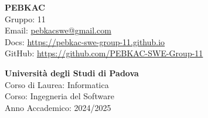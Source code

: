 \begin{minipage}[]{0.3\textwidth}
 
\end{minipage}
\hspace{0.05\textwidth}
\begin{minipage}[]{0.65\textwidth}
  {\Large \textbf{PEBKAC}} \\
  Gruppo: 11 \\
  Email: \href{mailto:pebkacswe@gmail.com}{pebkacswe@gmail.com} \\
  Docs: \href{https://pebkac-swe-group-11.github.io}{https://pebkac-swe-group-11.github.io} \\
  GitHub: \href{https://github.com/PEBKAC-SWE-Group-11}{https://github.com/PEBKAC-SWE-Group-11} \\
  
\end{minipage}

\bigskip

\begin{minipage}[]{0.3\textwidth}
 
\end{minipage}
\hspace{0.05\textwidth}
\begin{minipage}[]{0.65\textwidth}
  \textcolor{unipd}{
    \textbf{Università degli Studi di Padova} \\
    Corso di Laurea: Informatica \\
    Corso: Ingegneria del Software \\
    Anno Accademico: 2024/2025
  }
\end{minipage}


\bigskip
\bigskip
\bigskip